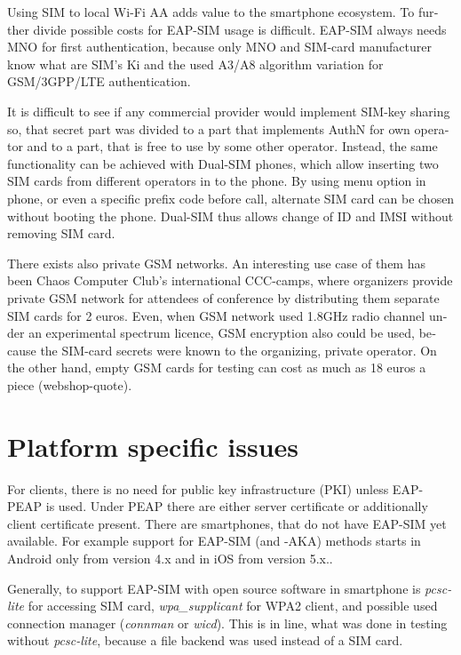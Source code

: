 \documentclass[12pt,a4paper,english]{tutthesis}
\begin{document}
\begin{otherlanguage}{english}
{Using SIM to local Wi-Fi AA adds value to the smartphone ecosystem.
To further divide possible costs for EAP-SIM usage
is difficult.
EAP-SIM always needs MNO for first authentication,
because only MNO and SIM-card manufacturer know 
what are SIM's Ki and the used A3/A8 algorithm variation
for GSM/3GPP/LTE authentication.

It is difficult to see if any commercial provider would implement
SIM-key sharing so, that secret part was divided to a part that
implements AuthN for own operator and to a part, that is free to use by
some other operator.  Instead, the same functionality can be achieved with
Dual-SIM phones, which allow inserting two SIM cards from different
operators in to the phone. By using menu option in phone, or even a
specific prefix code before call, alternate SIM card can be chosen
without booting the phone.
Dual-SIM thus allows change of ID and IMSI without removing SIM card.

There exists also private GSM networks. An interesting use case
of them  has been Chaos Computer Club's international 
CCC-camps\cite{ccc}, where organizers 
provide private GSM network for attendees of conference
by distributing them separate SIM cards for 2 euros.  Even, when GSM
network used 1.8GHz radio channel under an experimental spectrum
licence,  GSM encryption also could be used, because the SIM-card secrets were known
to the organizing, private operator.
On the other hand, empty GSM cards for testing can cost as much as 
18 euros a piece (webshop-quote\cite{smartjac-testsim}).


\section{Platform specific issues}
\label{sec-6-3}

For clients, there is no need for public key infrastructure (PKI) 
unless EAP-PEAP is used. Under PEAP there are either server
certificate or additionally client certificate present.
There are smartphones, that do not have EAP-SIM yet available.
For example support for
EAP-SIM (and -AKA) methods starts in Android only from version 4.x and in
iOS from version 5.x.\cite{sim-support}.


Generally, to support EAP-SIM  with open source software in 
smartphone is \emph{pcsc-lite} for accessing SIM card, \emph{wpa\_supplicant} for
WPA2 client, and possible used connection manager (\emph{connman} or
\emph{wicd}). This is in line, what was done in testing without \emph{pcsc-lite},
because a file backend was used instead of a SIM card.





}
\end{otherlanguage}
\end{document}
